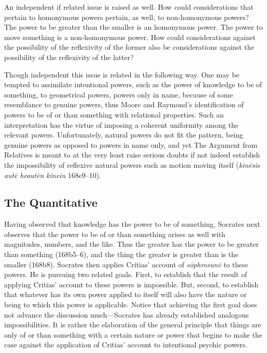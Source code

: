 An independent if related issue is raised as well. How could considerations that pertain to homonymous powers pertain, as well, to non-homonymous powers? The power to be greater than the smaller is an homonymous power. The power to move something is a non-homonymous power. How could considerations against the possibility of the reflexivity of the former also be considerations against the possibility of the reflexivity of the latter?

Though independent this issue is related in the following way. One may be tempted to assimilate intentional powers, such as the power of knowledge to be of something, to geometrical powers, powers only in name, because of some resemblance to genuine powers, thus Moore and Raymond's \citeyearpar[24 n74]{Moore:2019aa} identification of powers to be of or than something with relational properties. Such an interpretation has the virtue of imposing a coherent uniformity among the relevant powers. Unfortunately, natural powers do not fit the pattern, being genuine powers as opposed to powers in name only, and yet The Argument from Relatives is meant to at the very least raise serious doubts if not indeed establish the impossibility of reflexive natural powers such as motion moving itself (\emph{kinēsis autē heautēn kinein} 168e9–10).

\subsection{The Quantitative} %
\label{sub:the_quantitative}

Having observed that knowledge has the power to be of something, Socrates next observes that the power to be of or than something arises as well with magnitudes, numbers, and the like. Thus the greater has the power to be greater than something (168b5–6), and the thing the greater is greater than is the smaller (168b8). Socrates then applies Critias' account of \emph{sōphrosunē} to these powers. He is pursuing two related goals. First, to establish that the result of applying Critias' account to these powers is impossible. But, second, to establish that whatever has its own power applied to itself will also have the nature or being to which this power is applicable. Notice that achieving the first goal does not advance the discussion much—Socrates has already established analogous impossibilities. It is rather the elaboration of the general principle that things are only of or than something with a certain nature or power that begins to make the case against the application of Critias' account to intentional psychic powers.

